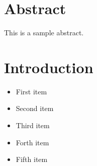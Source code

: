 \documentclass{article}
\begin{document}
\section*{Abstract}
This is a sample abstract.
\section*{Introduction}
\begin{itemize}
    \item First item
    \item Second item
    \item Third item
    \item Forth item 
    \item Fifth item
\end{itemize}
\end{document}
